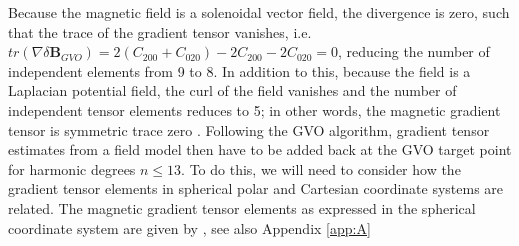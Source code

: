 \documentclass[extra,mreferee]{gji}
\begin{document}
Because the magnetic field is a solenoidal vector field, the divergence is zero, such that the trace of the gradient tensor vanishes, i.e. $tr(\nabla \delta \mathbf{B}_{GVO})=2(C_{200}+C_{020})-2C_{200}-2C_{020}=0$, reducing the number of independent elements from 9 to 8. In addition to this, because the field is a Laplacian potential field, the curl of the field vanishes and the number of independent tensor elements reduces to 5; in other words, the magnetic gradient tensor is  symmetric  trace  zero \citep{kotsiaros_Olsen_2012}.
\newline
\newline
Following the GVO algorithm, gradient tensor estimates from a field model then have to be added back at the GVO target point for harmonic degrees $n \leq 13$.  To do this, we will need to consider how the gradient tensor elements in spherical polar and Cartesian coordinate systems are related. The magnetic gradient tensor elements as expressed in the spherical coordinate system are given by \citep{Olsen_Kotsiaros_2011,kotsiaros_Olsen_2012}, see also Appendix \ref{app:A}
\end{document}
